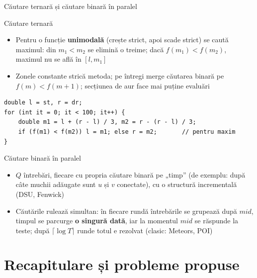 \documentclass[8pt,mathserif]{beamer}
\begin{document}
\begin{frame}[fragile]{Căutare ternară și căutare binară în paralel}
  \lstset{basicstyle=\ttfamily\footnotesize}
  \begin{block}{Căutare ternară}
    \begin{itemize}
      \item Pentru o funcție \textbf{unimodală} (crește strict, apoi scade strict) se caută maximul: din $m_1 < m_2$ se elimină o treime; dacă $f(m_1) < f(m_2)$, maximul nu se află în $[l, m_1]$
      \item Zonele constante strică metoda; pe întregi merge căutarea binară pe $f(m) < f(m+1)$; secțiunea de aur face mai puține evaluări
    \end{itemize}
  \end{block}
  \begin{lstlisting}
double l = st, r = dr;
for (int it = 0; it < 100; it++) {
    double m1 = l + (r - l) / 3, m2 = r - (r - l) / 3;
    if (f(m1) < f(m2)) l = m1; else r = m2;       // pentru maxim
}
  \end{lstlisting}
  \begin{block}{Căutare binară în paralel}
    \begin{itemize}
      \item $Q$ întrebări, fiecare cu propria căutare binară pe „timp” (de exemplu: după câte muchii adăugate sunt $u$ și $v$ conectate), cu o structură incrementală (DSU, Fenwick)
      \item Căutările rulează simultan: în fiecare rundă întrebările se grupează după $mid$, timpul se parcurge \textbf{o singură dată}, iar la momentul $mid$ se răspunde la teste; după $\lceil \log T \rceil$ runde totul e rezolvat (clasic: Meteors, POI)
    \end{itemize}
  \end{block}
\end{frame}

\section{Recapitulare și probleme propuse}
\end{document}
